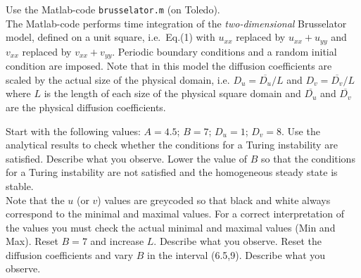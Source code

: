 \begin{Exercise}[name=Numerical experiments]
Use the Matlab-code \verb#brusselator.m# (on Toledo).\\[-.5\baselineskip]

\noindent
The Matlab-code performs time integration of the {\it two-dimensional} Brusselator model, defined on a unit square, i.e.\ Eq.(1) with $u_{xx}$ replaced by $u_{xx} + u_{yy}$ and $v_{xx}$ replaced by $v_{xx} + v_{yy}$. Periodic boundary conditions  and a random initial condition are imposed. Note that in this model the diffusion coefficients are scaled by the actual size of the physical domain, i.e. 
$D_u = \overline{D_u}/L$ and $D_v = \overline{D_v}/L$ where $L$ is the length of each size of the physical square domain and $\overline{D_u}$ and $\overline{D_v}$ are the physical diffusion coefficients.

\Question
Start with the following values: $A=4.5$; $B=7$; $D_u = 1$; $D_v = 8$.
Use the analytical results to check whether the conditions for a Turing instability are satisfied.
Describe what you observe.
\Question 
Lower the value of $B$ so that the conditions for a Turing instability are not satisfied and the homogeneous steady state is stable.  \\
Note that the $u$ (or $v$) values are greycoded so that black and white always correspond to the minimal and maximal values. For a correct interpretation of the values you must check the actual minimal and maximal values (Min and Max).
\Question Reset $B=7$ and increase $L$. Describe what you observe.
\Question Reset the diffusion coefficients and vary $B$ in the interval (6.5,9). Describe what you observe.

\end{Exercise}


